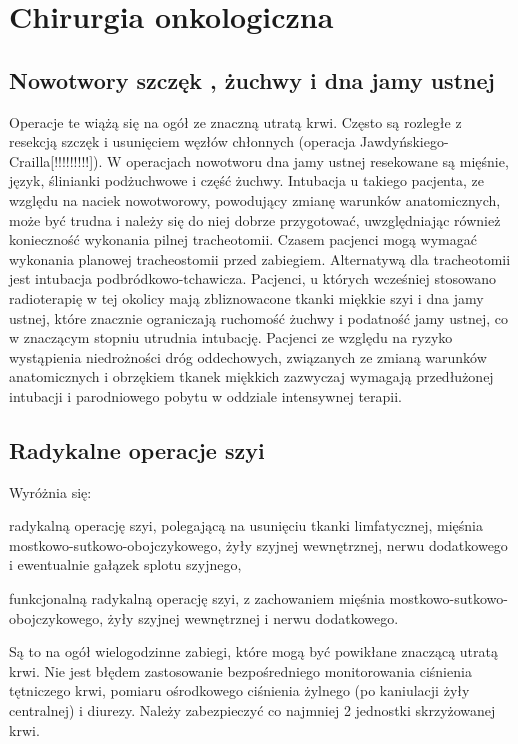 \documentclass[a4paper, 12pt]{report}
\begin{document}
\section{Chirurgia onkologiczna}

\subsection{Nowotwory szczęk , żuchwy i dna jamy ustnej}

Operacje te wiążą się na ogół ze znaczną utratą krwi. Często są
rozległe z resekcją szczęk i usunięciem węzłów chłonnych (operacja
Jawdyńskiego-Crailla[!!!!!!!!!]). W operacjach nowotworu dna jamy
ustnej resekowane są mięśnie, język, ślinianki podżuchwowe i część
żuchwy. Intubacja u takiego pacjenta, ze względu na naciek
nowotworowy, powodujący zmianę warunków anatomicznych, może być trudna
i należy się do niej dobrze przygotować, uwzględniając również
konieczność wykonania pilnej tracheotomii. Czasem pacjenci mogą
wymagać wykonania planowej tracheostomii przed zabiegiem. Alternatywą
dla tracheotomii jest intubacja podbródkowo-tchawicza. Pacjenci, u
których wcześniej stosowano radioterapię w tej okolicy mają
zbliznowacone tkanki miękkie szyi i dna jamy ustnej, które znacznie
ograniczają ruchomość żuchwy i podatność jamy ustnej, co w znaczącym
stopniu utrudnia intubację.  Pacjenci ze względu na ryzyko wystąpienia
niedrożności dróg oddechowych, związanych ze zmianą warunków
anatomicznych i obrzękiem tkanek miękkich zazwyczaj wymagają
przedłużonej intubacji i parodniowego pobytu w oddziale intensywnej
terapii.

\subsection{Radykalne operacje szyi}

Wyróżnia się: 
\begin{inparaenum}
\item radykalną operację szyi, polegającą na usunięciu tkanki
limfatycznej, mięśnia mostkowo-sutkowo-obojczykowego, żyły szyjnej
wewnętrznej, nerwu dodatkowego i ewentualnie gałązek splotu szyjnego,
\item funkcjonalną radykalną operację szyi, z zachowaniem mięśnia
mostkowo-sutkowo-obojczykowego, żyły szyjnej wewnętrznej i nerwu
dodatkowego.
\end{inparaenum}

Są to na ogół wielogodzinne zabiegi, które mogą być powikłane znaczącą
utratą krwi. Nie jest błędem zastosowanie bezpośredniego monitorowania
ciśnienia tętniczego krwi, pomiaru ośrodkowego ciśnienia żylnego (po
kaniulacji żyły centralnej) i diurezy. Należy zabezpieczyć co najmniej
2 jednostki skrzyżowanej krwi. 
\end{document}
